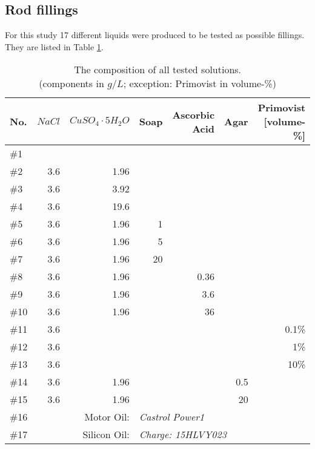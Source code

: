 \subsection{Rod fillings}

For this study 17 different liquids were produced to be tested as possible fillings.
They are listed in Table \ref{tab:solutions}.


\begin{table}[!hbt]
\centering
\begin{tabular}{@{}l|rrrrrr@{}}
No.   & $NaCl$   & $CuSO_4\cdot5H_2O$          & Soap & Ascorbic Acid & Agar & Primovist [volume-\%]\\
\toprule
\#1  &             &                   &      &               &           &		\\
\#2  & 3.6         & 1.96              &      &               &           &		\\
\#3  & 3.6         & 3.92              &      &               &           &		\\
\#4  & 3.6         & 19.6              &      &               &           &		\\
\#5  & 3.6         & 1.96              & 1    &               &           &		\\
\#6  & 3.6         & 1.96              & 5    &               &           &		\\
\#7  & 3.6         & 1.96              & 20   &               &           &		\\
\#8  & 3.6         & 1.96              &      & 0.36          &           &		\\
\#9  & 3.6         & 1.96              &      & 3.6           &           &		\\
\#10 & 3.6         & 1.96              &      & 36            &           &		\\
\#11 & 3.6         &                   &      &               &           & 0.1\%	\\
\#12 & 3.6         &                   &      &               &           & 1\%		\\
\#13 & 3.6         &                   &      &               &           & 10\%	\\
\#14 & 3.6         & 1.96              &      &               &  0.5      &		\\
\#15 & 3.6         & 1.96              &      &               &   20      &		\\
\midrule
\#16 & \multicolumn{2}{r}{Motor Oil:}   & \multicolumn{4}{l}{\textit{Castrol Power1}}      \\
\#17 & \multicolumn{2}{r}{Silicon Oil:} & \multicolumn{4}{l}{\textit{Charge: 15HLVY023}}   \\ \bottomrule
\end{tabular}
\caption{The composition of all tested solutions.\\(components in $g/L$; exception: Primovist in volume-\%)}
\label{tab:solutions}
\end{table}

